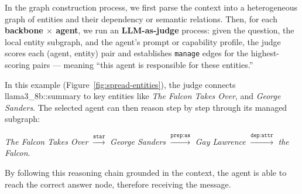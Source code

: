 \documentclass[11pt]{article}
\begin{document}
In the graph construction process, we first parse the context into a heterogeneous graph of entities and their dependency or semantic relations. Then, for each \textbf{backbone $\times$ agent}, we run an \textbf{LLM-as-judge} process: given the question, the local entity subgraph, and the agent’s prompt or capability profile, the judge scores each (agent, entity) pair and establishes \texttt{manage} edges for the highest-scoring pairs — meaning ``this agent is responsible for these entities.''

In this example (Figure~\ref{fig:spread-entities}), the judge connects llama3\_8b::summary to key entities like \textit{The Falcon Takes Over}, and \textit{George Sanders}. The selected agent can then reason step by step through its managed subgraph:

\textit{The Falcon Takes Over} $\xrightarrow{\texttt{star}}$ \textit{George Sanders} $\xrightarrow{\texttt{prep:as}}$ \textit{Gay Lawrence} $\xrightarrow{\texttt{dep:attr}}$ \textit{the Falcon}.

By following this reasoning chain grounded in the context, the agent is able to reach the correct answer node, therefore receiving the message.
\end{document}
